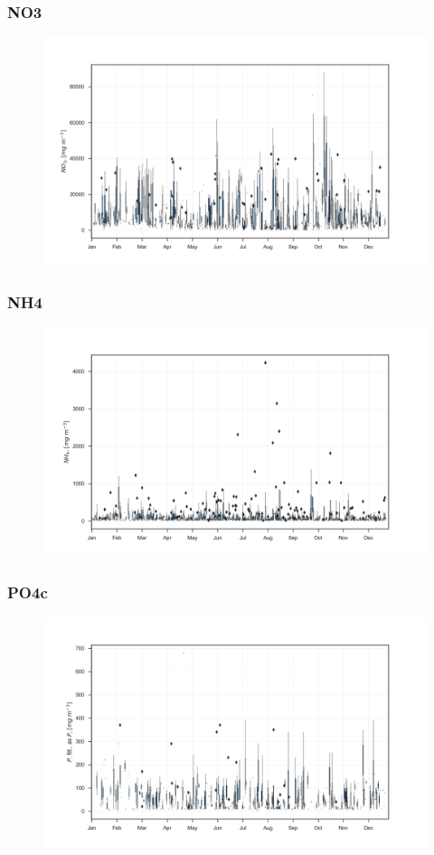 \documentclass{beamer}
\begin{document}
\begin{frame}
\frametitle{NO3}
\begin{figure}
\includegraphics[width=\textwidth]{rivers/all/1yr_boxpl/NO3.png}
\end{figure}
\end{frame}

\begin{frame}
\frametitle{NH4}
\begin{figure}
\includegraphics[width=\textwidth]{rivers/all/1yr_boxpl/NH4.png}
\end{figure}
\end{frame}

\begin{frame}
\frametitle{PO4c}
\begin{figure}
\includegraphics[width=\textwidth]{rivers/all/1yr_boxpl/PO4c.png}
\end{figure}
\end{frame}
\end{document}

